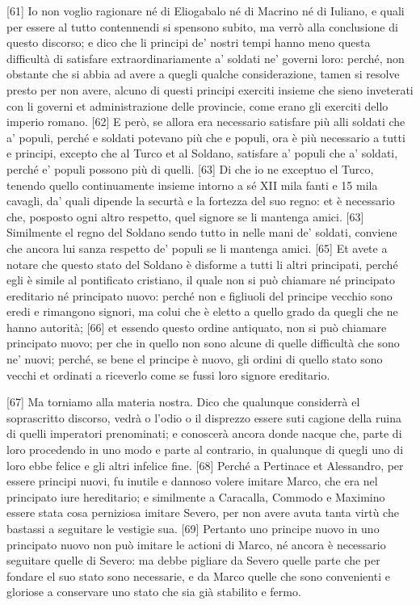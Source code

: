 {[}61{]} Io non voglio ragionare né di Eliogabalo né di Macrino né di
Iuliano, e quali per essere al tutto contennendi si spensono subito, ma
verrò alla conclusione di questo discorso; e dico che li principi de'
nostri tempi hanno meno questa difficultà di satisfare
extraordinariamente a' soldati ne' governi loro: perché, non obstante
che si abbia ad avere a quegli qualche considerazione, tamen si resolve
presto per non avere, alcuno di questi principi exerciti insieme che
sieno inveterati con li governi et administrazione delle provincie, come
erano gli exerciti dello imperio romano. {[}62{]} E però, se allora era
necessario satisfare più alli soldati che a' populi, perché e soldati
potevano più che e populi, ora è più necessario a tutti e principi,
excepto che al Turco et al Soldano, satisfare a' populi che a' soldati,
perché e' populi possono più di quelli. {[}63{]} Di che io ne exceptuo
el Turco, tenendo quello continuamente insieme intorno a sé XII mila
fanti e 15 mila cavagli, da' quali dipende la securtà e la fortezza del
suo regno: et è necessario che, posposto ogni altro respetto, quel
signore se li mantenga amici. {[}63{]} Similmente el regno del Soldano
sendo tutto in nelle mani de' soldati, conviene che ancora lui sanza
respetto de' populi se li mantenga amici. {[}65{]} Et avete a notare che
questo stato del Soldano è disforme a tutti li altri principati, perché
egli è simile al pontificato cristiano, il quale non si può chiamare né
principato ereditario né principato nuovo: perché non e figliuoli del
principe vecchio sono eredi e rimangono signori, ma colui che è eletto a
quello grado da quegli che ne hanno autorità; {[}66{]} et essendo questo
ordine antiquato, non si può chiamare principato nuovo; per che in
quello non sono alcune di quelle difficultà che sono ne' nuovi; perché,
se bene el principe è nuovo, gli ordini di quello stato sono vecchi et
ordinati a riceverlo come se fussi loro signore ereditario.

{[}67{]} Ma torniamo alla materia nostra. Dico che qualunque considerrà
el soprascritto discorso, vedrà o l'odio o il disprezzo essere suti
cagione della ruina di quelli imperatori prenominati; e conoscerà ancora
donde nacque che, parte di loro procedendo in uno modo e parte al
contrario, in qualunque di quegli uno di loro ebbe felice e gli altri
infelice fine. {[}68{]} Perché a Pertinace et Alessandro, per essere
principi nuovi, fu inutile e dannoso volere imitare Marco, che era nel
principato iure hereditario; e similmente a Caracalla, Commodo e
Maximino essere stata cosa perniziosa imitare Severo, per non avere
avuta tanta virtù che bastassi a seguitare le vestigie sua. {[}69{]}
Pertanto uno principe nuovo in uno principato nuovo non può imitare le
actioni di Marco, né ancora è necessario seguitare quelle di Severo: ma
debbe pigliare da Severo quelle parte che per fondare el suo stato sono
necessarie, e da Marco quelle che sono convenienti e gloriose a
conservare uno stato che sia già stabilito e fermo.

